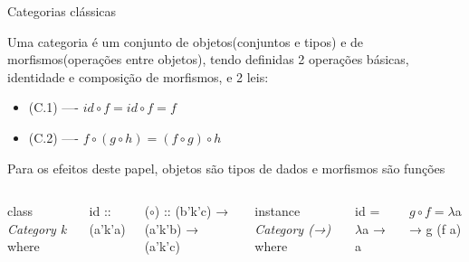 \documentclass{beamer}
\begin{document}
\begin{frame}{Categorias clássicas}

Uma categoria é um conjunto de objetos(conjuntos e tipos) e de morfismos(operações entre objetos), tendo definidas 2 operações básicas, identidade e composição de morfismos, e 2 leis:

\begin{itemize}
    \item<1-> (C.1) ---- $id \circ f = id \circ f = f$ 
    \item<2-> (C.2) ---- $f \circ (g \circ h) = (f \circ g) \circ h$
\end{itemize}


\begin{block}

Para os efeitos deste papel, objetos são tipos de dados e morfismos são funções

\end{block}

\begin{block}

\begin{columns}
 
class \textit{Category k} where

\hspace{0.2cm}id :: (a'k'a)
    
\hspace{0.2cm}($\circ$) :: (b'k'c) → (a'k'b) → (a'k'c)
 
instance \textit{Category (→)} where

\hspace{0.2cm}id = $\lambda$a → a 

\hspace{0.2cm}$g \circ f = \lambda$a → g (f a)  

\end{columns}

\end{block}

\end{frame}
\end{document}
